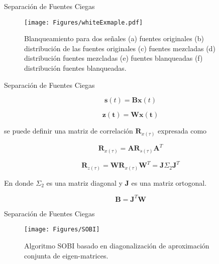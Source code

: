 \documentclass[10pt]{beamer}
\newcommand{\mat}[1] {\mathbf{#1}}
\newcommand{\vect}[1]{\mathbf{#1}}
\begin{document}
\begin{frame}{Separación de Fuentes Ciegas}
\begin{figure}[ht]
\centering
\texttt{[image: Figures/whiteExmaple.pdf]}
\caption{Blanqueamiento para dos señales (a) fuentes originales (b) distribución de las fuentes originales (c) fuentes mezcladas (d) distribución fuentes mezcladas (e) fuentes blanqueadas (f) distribución fuentes blanqueadas. }
\label{whitening}
\end{figure}
\end{frame}






\begin{frame}{Separación de Fuentes Ciegas}

\begin{equation}
\vect{s}(t) = \mat{B}\vect{x}(t)
\end{equation}

\begin{equation}
\vect{z(t)} = \mat{W}\vect{x(t)}
\end{equation}

\noindent se puede definir una matriz de correlación $\mat{R}_{x(\tau)}$ expresada como

\begin{equation}
\mat{R}_{x(\tau)}= \mat{A}\mat{R}_{s(\tau)}\mat{A}^T
\end{equation}
  
\begin{equation}
\mat{R}_{z(\tau)}=\mat{W}\mat{R}_{x(\tau)}\mat{W}^T=\mat{J} {\Sigma_2} \mat{J}^T
\end{equation}


\noindent En donde ${\Sigma_2}$ es una matriz diagonal y $\mat{J}$ es una matriz ortogonal. 



\begin{equation}
\mat{B} = \mat{J}^T\mat{W}
\end{equation} 

\end{frame}


\begin{frame}{Separación de Fuentes Ciegas}

\begin{figure}[ht]
\centering
\texttt{[image: Figures/SOBI]}
\caption{Algoritmo SOBI basado en diagonalización de aproximación conjunta de eigen-matrices.}
\label{SOBI}
\end{figure}
\end{frame}
\end{document}
